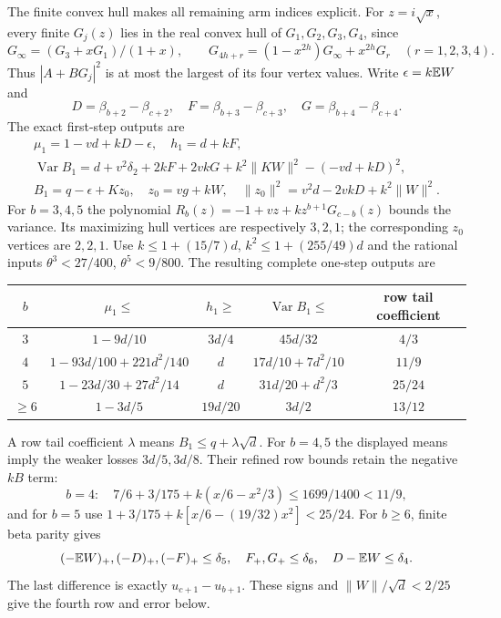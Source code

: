 The finite convex hull makes all remaining arm indices explicit.
For $z=i\sqrt x$, every finite $G_j(z)$ lies in the real convex hull of
$G_1,G_2,G_3,G_4$, since
\[
 G_\infty=(G_3+xG_1)/(1+x),\qquad
 G_{4h+r}=(1-x^{2h})G_\infty+x^{2h}G_r
 \quad(r=1,2,3,4).
\]
Thus $|A+BG_j|^2$ is at most the largest of its four vertex values.
Write $\epsilon=k\mathbb E W$ and
\[
 D=\beta_{b+2}-\beta_{c+2},\quad
 F=\beta_{b+3}-\beta_{c+3},\quad
 G=\beta_{b+4}-\beta_{c+4}.
\]
The exact first-step outputs are
\begin{gather*}
 \mu_1=1-vd+kD-\epsilon,\quad h_1=d+kF,\\
 \operatorname{Var}B_1=d+v^2\delta_{2}+2kF+2vkG+k^2\|KW\|^2-(-vd+kD)^2,\\
 B_1=q-\epsilon+Kz_0,\quad z_0=vg+kW,\quad
 \|z_0\|^2=v^2d-2vkD+k^2\|W\|^2.
\end{gather*}
For $b=3,4,5$ the polynomial
$R_b(z)=-1+vz+kz^{b+1}G_{c-b}(z)$ bounds the variance.
Its maximizing hull vertices are respectively $3,2,1$;
the corresponding $z_0$ vertices are $2,2,1$.
Use $k\le1+(15/7)d$, $k^2\le1+(255/49)d$ and the rational inputs
$\theta^3<27/400$, $\theta^5<9/800$.
The resulting complete one-step outputs are
\begin{center}\small
\begin{tabular}{@{}ccccc@{}}\toprule
$b$&$\mu_1\le$&$h_1\ge$&$\operatorname{Var}B_1\le$&row tail coefficient\\\midrule
$3$&$1-9d/10$&$3d/4$&$45d/32$&$4/3$\\
$4$&$1-93d/100+221d^2/140$&$d$&$17d/10+7d^2/10$&$11/9$\\
$5$&$1-23d/30+27d^2/14$&$d$&$31d/20+d^2/3$&$25/24$\\
$\ge6$&$1-3d/5$&$19d/20$&$3d/2$&$13/12$\\\bottomrule
\end{tabular}
\end{center}
A row tail coefficient $\lambda$ means $B_1\le q+\lambda\sqrt d$.
For $b=4,5$ the displayed means imply the weaker losses $3d/5,3d/8$.
Their refined row bounds retain the negative $kB$ term:
\[
 b=4:\quad7/6+3/175+k(x/6-x^2/3)\le1699/1400<11/9,
\]
and for $b=5$ use
$1+3/175+k[x/6-(19/32)x^2]<25/24$.
For $b\ge6$, finite beta parity gives
\[
 (-\mathbb E W)_+,(-D)_+,(-F)_+\le \delta_{5},\quad F_+,G_+\le \delta_{6},\quad
 D-\mathbb E W\le \delta_{4}.
\]
The last difference is exactly $u_{c+1}-u_{b+1}$.
These signs and $\|W\|/\sqrt d<2/25$ give the fourth row and error below.

